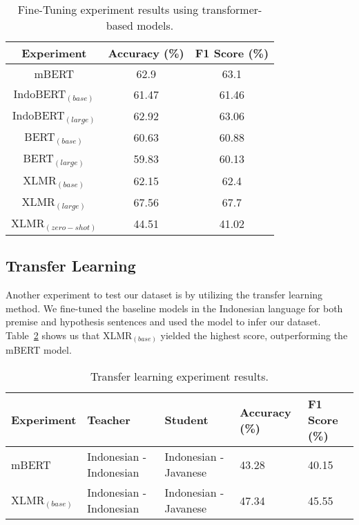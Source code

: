 \documentclass[a4paper, conference]{IEEEtran}
\begin{document}
\begin{table}[!t]
\begin{center}
\begin{tabular}{ccc}
\hline
\textbf{Experiment} & \textbf{Accuracy (\%)}& \textbf{F1 Score (\%)} \\
\hline
mBERT & 62.9 & 63.1  \\
IndoBERT$_{(base)}$ & 61.47 & 61.46  \\
IndoBERT$_{(large)}$ & 62.92 & 63.06 \\
BERT$_{(base)}$ & 60.63 & 60.88  \\
BERT$_{(large)}$ & 59.83 & 60.13  \\
XLMR$_{(base)}$ & 62.15 & 62.4  \\
XLMR$_{(large)}$ & 67.56 & 67.7  \\
XLMR$_{(zero-shot)}$ & 44.51 & 41.02  \\
\hline
\end{tabular}
\captionsetup{labelformat=default}
\caption{Fine-Tuning experiment results using transformer-based models.}
\label{tblBaselineModel}
\end{center}
\end{table}

\subsection{Transfer Learning}
Another experiment to test our dataset is by utilizing the transfer learning method. We fine-tuned the baseline models in the Indonesian language for both premise and hypothesis sentences and used the model to infer our dataset. Table~\ref{tblTransferLearning} shows us that XLMR$_{(base)}$ yielded the highest score, outperforming the mBERT model.

\begin{table}[!t]
\centering
\begin{tabular}{p{0.6in}p{0.6in}p{0.6in}p{0.4in}p{0.4in}}
\hline
\textbf{Experiment} & \textbf{Teacher} & \textbf{Student} & \textbf{Accuracy (\%)}& \textbf{F1 Score (\%)} \\
\hline
mBERT & Indonesian - Indonesian & Indonesian - Javanese & 43.28 & 40.15  \\
XLMR$_{(base)}$ & Indonesian - Indonesian & Indonesian - Javanese & 47.34 & 45.55  \\
\hline
\end{tabular}
\captionsetup{labelformat=default}
\caption{Transfer learning experiment results.}
\label{tblTransferLearning}
\end{table}
\end{document}
